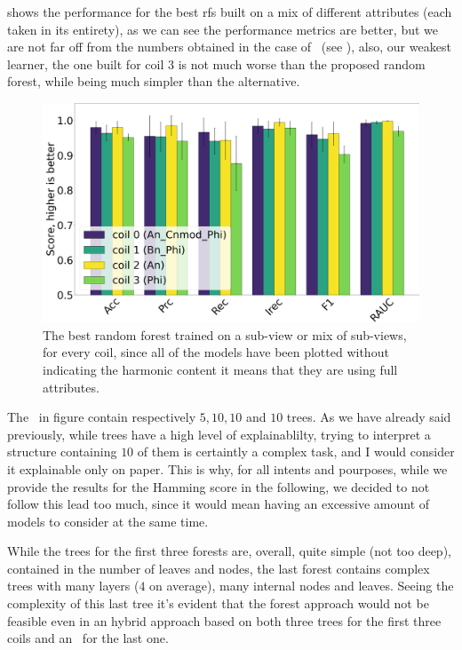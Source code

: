  shows the performance for the best rfs built on a mix of different attributes
(each taken in its entirety), as we can see the performance metrics are better, but we are not far
off from the numbers obtained in the case of \dts\ (see ), also, our weakest
learner, the one built for coil $3$ is not much worse than the proposed random forest, while being
much simpler than the alternative.
\begin{figure}
	\centering
	\includegraphics[width=\linewidth]{img/best_rfs_qlp.png}
	\caption{The best random forest trained on a sub-view or mix of sub-views, for every coil,
		since all of the models have been plotted without indicating the harmonic content it means
		that they are using full attributes.}\label{fig:brfs-qlp}
\end{figure}
The \rfs\ in figure contain respectively $5, 10, 10$ and $10$ trees. As we have already said
previously, while trees have a high level of explainablilty, trying to interpret a structure
containing $10$ of them is certaintly a complex task, and I would consider it explainable only on
paper. This is why, for all intents and pourposes, while we provide the results for the Hamming
score in the following, we decided to not follow this lead too much, since it would mean having an
excessive amount of models to consider at the same time.

While the trees for the first three forests are, overall, quite simple (not too deep), contained in
the number of leaves and nodes, the last forest contains complex trees with many layers ($4$ on
average), many internal nodes and leaves. Seeing the complexity of this last tree it's evident that
the forest approach would not be feasible even in an hybrid approach based on both three trees for
the first three coils and an \rf\ for the last one.

